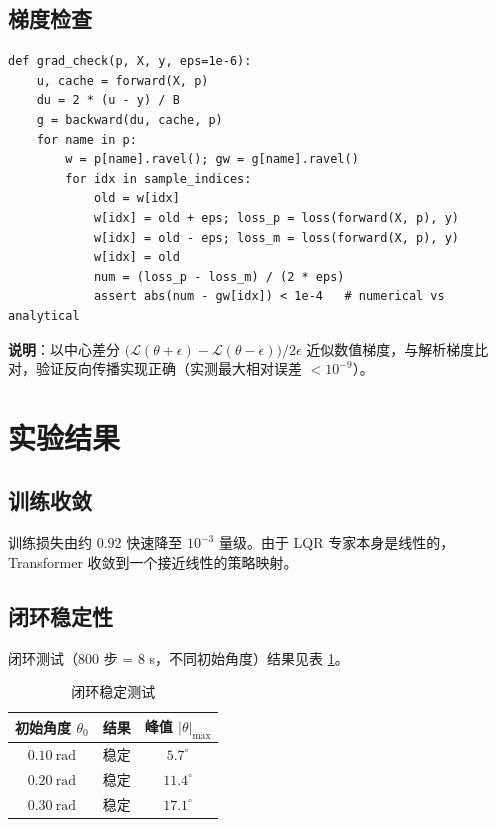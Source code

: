 \documentclass[11pt,a4paper]{article}
\begin{document}
\subsection{梯度检查}

\begin{lstlisting}
def grad_check(p, X, y, eps=1e-6):
    u, cache = forward(X, p)
    du = 2 * (u - y) / B
    g = backward(du, cache, p)
    for name in p:
        w = p[name].ravel(); gw = g[name].ravel()
        for idx in sample_indices:
            old = w[idx]
            w[idx] = old + eps; loss_p = loss(forward(X, p), y)
            w[idx] = old - eps; loss_m = loss(forward(X, p), y)
            w[idx] = old
            num = (loss_p - loss_m) / (2 * eps)
            assert abs(num - gw[idx]) < 1e-4   # numerical vs analytical
\end{lstlisting}

\textbf{说明}：以中心差分 $\big(\mathcal L(\theta + \epsilon) - \mathcal L(\theta - \epsilon)\big)/2\epsilon$ 近似数值梯度，与解析梯度比对，验证反向传播实现正确（实测最大相对误差 $<10^{-9}$）。

\section{实验结果}

\subsection{训练收敛}

训练损失由约 $0.92$ 快速降至 $10^{-3}$ 量级。由于 LQR 专家本身是线性的，Transformer 收敛到一个接近线性的策略映射。

\subsection{闭环稳定性}

闭环测试（800 步 = 8 s，不同初始角度）结果见表 \ref{tab:closedloop}。

\begin{table}[H]
\centering
\caption{闭环稳定测试}
\label{tab:closedloop}
\begin{tabular}{@{}ccc@{}}
\toprule
初始角度 $\theta_0$ & 结果 & 峰值 $|\theta|_{\max}$ \\
\midrule
$0.10\ \mathrm{rad}$ & 稳定 & $5.7^\circ$ \\
$0.20\ \mathrm{rad}$ & 稳定 & $11.4^\circ$ \\
$0.30\ \mathrm{rad}$ & 稳定 & $17.1^\circ$ \\
\bottomrule
\end{tabular}
\end{table}
\end{document}
